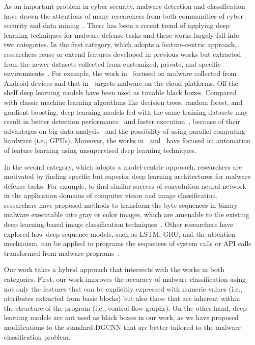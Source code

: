 
As an important problem in cyber security, malware detection and classification have drawn the attentions of many researchers from both communities of cyber security and data mining~\cite{MalDetectSurvey1, MalDetectSurvey2}.
There has been a recent trend of applying deep learning techniques for malware defense tasks and these works largely fall into two categories.
In the first category, which adopts a feature-centric approach, researchers reuse or extend features developed in previous works but extracted from the newer datasets collected from customized, private, and specific environments~\cite{EarlyStageRnn, DeepFlow, DeepAM, RandomProjectionNn, AutoEncoderFeatureLearn, AutoEncoderMicrosoft, LstmSyscall, MalwareLstmGru}.
For example, the work in~\cite{DeepFlow} focused on malware collected from Android devices and that in~\cite{DeepAM} targets malware on the cloud platforms.
Off-the-shelf deep learning models have been used as tunable black boxes.
Compared with classic machine learning algorithms like decision trees, random forest, and gradient boosting,
deep learning models fed with the same training datasets may result in better detection performance~\cite{DeepFlow,RandomProjectionNn} and faster execution~\cite{EarlyStageRnn},
because of their advantages on big data analysis~\cite{RandomProjectionNn} and the possibility of using parallel computing hardware (i.e., GPUs).
Moreover, the works in~\cite{AutoEncoderFeatureLearn} and~\cite{AutoEncoderMicrosoft} have focused on automation of feature learning using unsupervised deep learning techniques.

In the second category, which adopts a model-centric approach, researchers are motivated by finding specific but superior deep learning architectures for malware defense tasks.
For example, to find similar success of convolution neural network in the application domains of computer vision and image classification, researchers have proposed methods to transform the byte sequences in binary malware executable into gray or color images, which are amenable to the existing deep learning-based image classification techniques~\cite{R2D2, GibertCnn}. Other researchers have explored how deep sequence models, such as LSTM, GRU, and the attention mechanism, can be applied to programs the sequences of system calls or API calls transformed from malware programs~\cite{LstmSyscall,MalwareLstmGru}. 

Our work takes a hybrid approach that intersects with the works in both categories. First, our work improves the accuracy of malware classification using not only the features that can be explicitly expressed with numeric values (i.e., attributes extracted from basic blocks) but also those that are inherent within the structure of the program (i.e., control flow graphs). On the other hand, deep learning models are not used as black boxes in our work, as we have proposed modifications to the standard DGCNN that are better tailored to the malware classification problem.

